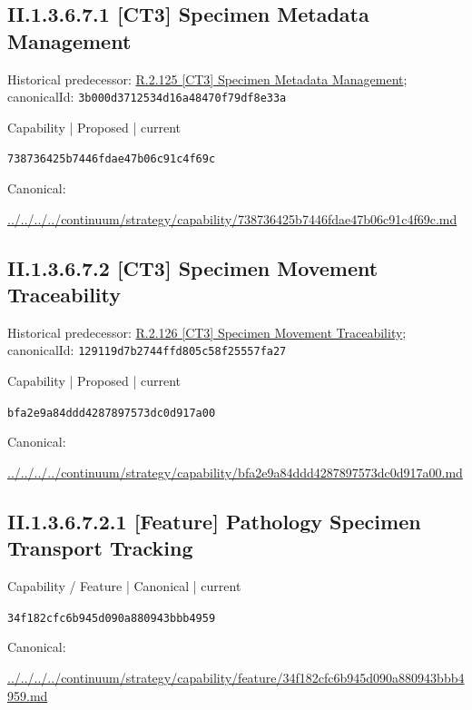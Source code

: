 \documentclass[10pt,a4paper]{article}
\begin{document}
\subsection*{II.1.3.6.7.1 [CT3] Specimen Metadata Management}
Historical predecessor: \hyperref[element-3b000d3712534d16a48470f79df8e33a]{R.2.125 [CT3] Specimen Metadata Management}; canonicalId: \texttt{3b000d3712534d16a48470f79df8e33a}\par
\label{element-738736425b7446fdae47b06c91c4f69c}
{\small Capability | Proposed | current}\par
\texttt{738736425b7446fdae47b06c91c4f69c}\par
Canonical: \par
{\footnotesize\url{../../../../continuum/strategy/capability/738736425b7446fdae47b06c91c4f69c.md}}\par
\subsection*{II.1.3.6.7.2 [CT3] Specimen Movement Traceability}
Historical predecessor: \hyperref[element-129119d7b2744ffd805c58f25557fa27]{R.2.126 [CT3] Specimen Movement Traceability}; canonicalId: \texttt{129119d7b2744ffd805c58f25557fa27}\par
\label{element-bfa2e9a84ddd4287897573dc0d917a00}
{\small Capability | Proposed | current}\par
\texttt{bfa2e9a84ddd4287897573dc0d917a00}\par
Canonical: \par
{\footnotesize\url{../../../../continuum/strategy/capability/bfa2e9a84ddd4287897573dc0d917a00.md}}\par
\subsection*{II.1.3.6.7.2.1 [Feature] Pathology Specimen Transport Tracking}
\label{element-34f182cfc6b945d090a880943bbb4959}
{\small Capability / Feature | Canonical | current}\par
\texttt{34f182cfc6b945d090a880943bbb4959}\par
Canonical: \par
{\footnotesize\url{../../../../continuum/strategy/capability/feature/34f182cfc6b945d090a880943bbb4959.md}}\par
\end{document}
